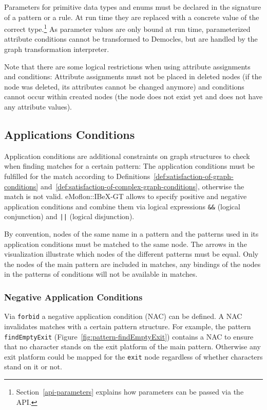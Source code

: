 Parameters for primitive data types and enums must be declared in the signature of a pattern or a rule.
At run time they are replaced with a concrete value of the correct type.\footnote{Section~\ref{api-parameters} explains how parameters can be passed via the API.}
As parameter values are only bound at run time, parameterized attribute conditions cannot be transformed to Democles, but are handled by the graph transformation interpreter.

Note that there are some logical restrictions when using attribute assignments and conditions:
Attribute assignments must not be placed in deleted nodes (if the node was deleted, its attributes cannot be changed anymore) and conditions cannot occur within created nodes (the node does not exist yet and does not have any attribute values).

\subsection{Applications Conditions}
\label{application-conditions}
Application conditions are additional constraints on graph structures to check when finding matches for a certain pattern:
The application conditions must be fulfilled for the match according to Definitions~\ref{def:satisfaction-of-graph-conditions} and~\ref{def:satisfaction-of-complex-graph-conditions}, otherwise the match is not valid.
eMoflon::IBeX-GT allows to specify positive and negative application conditions and combine them via logical expressions \texttt{\&\&} (logical conjunction) and \texttt{||} (logical disjunction).

By convention, nodes of the same name in a pattern and the patterns used in its application conditions must be matched to the same node.
The arrows in the visualization illustrate which nodes of the different patterns must be equal.
Only the nodes of the main pattern are included in matches, any bindings of the nodes in the patterns of conditions will not be available in matches.

\subsubsection{Negative Application Conditions}
Via \texttt{forbid} a negative application condition (NAC) can be defined.
A NAC invalidates matches with a certain pattern structure.
For example, the pattern \texttt{findEmptyExit} (Figure~\ref{fig:pattern-findEmptyExit}) contains a NAC to ensure that no character stands on the exit platform of the main pattern.
Otherwise any exit platform could be mapped for the \texttt{exit} node regardless of whether characters stand on it or not.

